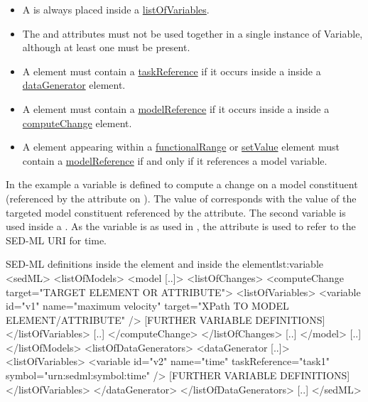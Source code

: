 \begin{itemize}
	\item A  is always placed inside a \hyperref[sec:listOfVariables]{listOfVariables}. 
	\item The \hyperref[sec:symbol]{} and \hyperref[sec:target]{} attributes must not be used together in a single instance of Variable, although at least one must be present.
	\item A  element must contain a \hyperref[sec:taskReference]{taskReference} if it occurs inside a \hyperref[sec:listOfVariables]{} inside a \hyperref[class:dataGenerator]{dataGenerator} element.
	\item A  element must contain a \hyperref[sec:modelReference]{modelReference} if it occurs inside a \hyperref[sec:listOfVariables]{} inside a \hyperref[class:computeChange]{computeChange} element.
	\item A  element appearing within a \hyperref[class:functionalRange]{functionalRange} or \hyperref[class:setValue]{setValue} element must contain a \hyperref[sec:modelReference]{modelReference} if and only if it references a model variable.
\end{itemize}

In the example a variable  is defined to compute a change on a model constituent (referenced by the \hyperref[sec:target]{} attribute on \hyperref[class:computeChange]{}). The value of  corresponds with the value of the targeted model constituent referenced by the  attribute. The second variable  is used inside a \hyperref[class:dataGenerator]{}. As the variable is  as used in , the \hyperref[sec:symbol]{} attribute is used to refer to the SED-ML URI for time.

\begin{myXmlLst}{SED-ML  definitions inside the  element and inside the  element}{lst:variable}
<sedML>
	<listOfModels>
		<model [..]>
			<listOfChanges>
				<computeChange target="TARGET ELEMENT OR ATTRIBUTE">
				<listOfVariables>
				   <variable id="v1" name="maximum velocity" target="XPath TO MODEL ELEMENT/ATTRIBUTE" />
				   [FURTHER VARIABLE DEFINITIONS]
				</listOfVariables>
				[..]
				</computeChange>
			</listOfChanges>
			[..]
		</model>
		[..]
	</listOfModels>
	<listOfDataGenerators>
		<dataGenerator [..]>
			<listOfVariables>
				<variable id="v2" name="time" taskReference="task1" symbol="urn:sedml:symbol:time" />
				[FURTHER VARIABLE DEFINITIONS]
			</listOfVariables>
		</dataGenerator>
	</listOfDataGenerators>
	[..]
</sedML>
\end{myXmlLst}


